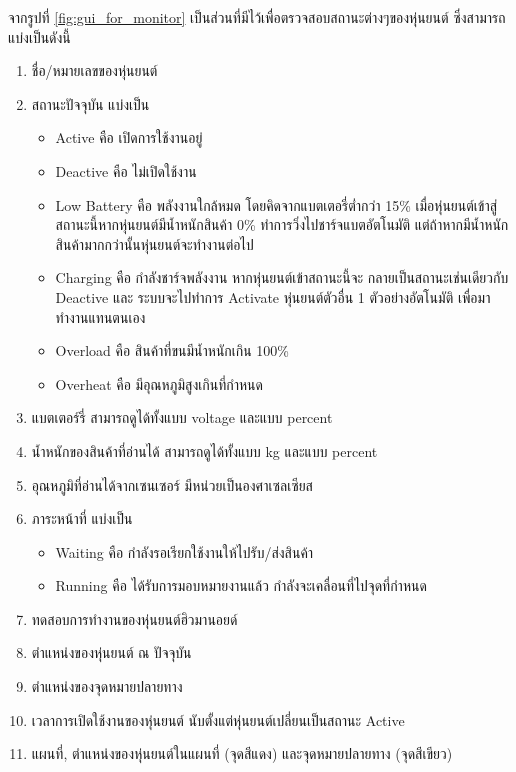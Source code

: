 \documentclass{classes/fiboreport}
\begin{document}
จากรูปที่ \ref{fig:gui_for_monitor} เป็นส่วนที่มีไว้เพื่อตรวจสอบสถานะต่างๆของหุ่นยนต์ ซึ่งสามารถแบ่งเป็นดังนี้
\begin{enumerate}[label=\arabic*, leftmargin=1.5cm]
	\item ชื่อ/หมายเลขของหุ่นยนต์
	\item สถานะปัจจุบัน แบ่งเป็น
	\vspace{-3mm}
	\begin{itemize}\setlength\itemsep{-0.3em}
		\item Active คือ เปิดการใช้งานอยู่
		\item Deactive คือ ไม่เปิดใช้งาน
		\item Low Battery คือ พลังงานใกล้หมด โดยคิดจากแบตเตอรี่ต่ำกว่า 15\%
		เมื่อหุ่นยนต์เข้าสู่สถานะนี้หากหุ่นยนต์มีน้ำหนักสินค้า 0\% ทำการวิ่งไปชาร์จแบตอัตโนมัติ
		แต่ถ้าหากมีน้ำหนักสินค้ามากกว่านั้นหุ่นยนต์จะทำงานต่อไป
		\item Charging คือ กำลังชาร์จพลังงาน หากหุ่นยนต์เข้าสถานะนี้จะ กลายเป็นสถานะเช่นเดียวกับ
		Deactive และ ระบบจะไปทำการ Activate หุ่นยนต์ตัวอื่น 1 ตัวอย่างอัตโนมัติ เพื่อมาทำงานแทนตนเอง 
		\item Overload คือ สินค้าที่ขนมีน้ำหนักเกิน 100\%
		\item Overheat คือ มีอุณหภูมิสูงเกินที่กำหนด 
	\end{itemize}
	\item แบตเตอร์รี่ สามารถดูได้ทั้งแบบ voltage และแบบ percent
	\item น้ำหนักของสินค้าที่อ่านได้ สามารถดูได้ทั้งแบบ kg และแบบ percent
	\item อุณหภูมิที่อ่านได้จากเซนเซอร์ มีหน่วยเป็นองศาเซลเซียส
	\item ภาระหน้าที่ แบ่งเป็น
	\vspace{-3mm}
	\begin{itemize}\setlength\itemsep{-0.3em}
		\item Waiting คือ กำลังรอเรียกใช้งานให้ไปรับ/ส่งสินค้า
		\item Running คือ ได้รับการมอบหมายงานแล้ว กำลังจะเคลื่อนที่ไปจุดที่กำหนด
	\end{itemize}
	\item ทดสอบการทำงานของหุ่นยนต์ฮิวมานอยด์
	\item ตำแหน่งของหุ่นยนต์ ณ ปัจจุบัน
	\item ตำแหน่งของจุดหมายปลายทาง
	\item เวลาการเปิดใช้งานของหุ่นยนต์ นับตั้งแต่หุ่นยนต์เปลี่ยนเป็นสถานะ Active
	\item แผนที่, ตำแหน่งของหุ่นยนต์ในแผนที่ (จุดสีแดง) และจุดหมายปลายทาง (จุดสีเขียว)
\end{enumerate}
\end{document}
